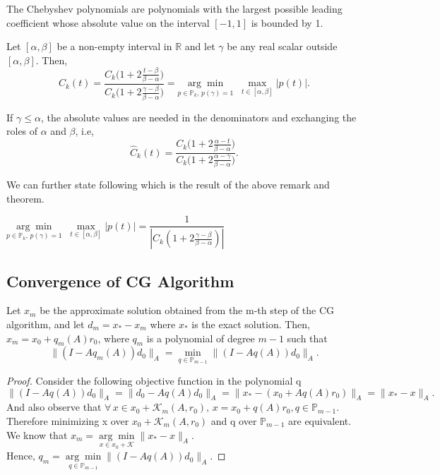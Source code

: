 \documentclass[10pt,a4paper]{article}
\begin{document}
\begin{remark}
The Chebyshev polynomials are polynomials with the largest possible leading coefficient whose absolute value on the interval $[-1,1]$ is bounded by 1.
\end{remark}

\begin{theorem}
Let $[\alpha,\beta]$ be a non-empty interval in $\mathbb{R}$ and let $\gamma$ be any real scalar outside $[\alpha,\beta].$ Then,
$$\hat{C}_k(t)=\frac{C_k\Big(1+2\frac{t-\beta}{\beta-\alpha}\Big)}{C_k\Big(1+2\frac{\gamma-\beta}{\beta-\alpha}\Big)}=\underset{p\in\mathbb{P}_k,\,p(\gamma)=1}{\arg\min}\;\;\underset{t\in[\alpha,\beta]}{\max}|p(t)|.$$
\end{theorem}

\begin{remark}
If $\gamma\le\alpha$, the absolute values are needed in the denominators and exchanging the roles of $\alpha$ and $\beta$, i.e,
$$\hat{C}_k(t)=\frac{C_k\Big(1+2\frac{\alpha-t}{\beta-\alpha}\Big)}{C_k\Big(1+2\frac{\alpha-\gamma}{\beta-\alpha}\Big)}.$$
\end{remark}

We can further state following which is the result of the above remark and theorem.

\begin{corollary}
$\underset{p\in\mathbb{P}_k,\,p(\gamma)=1}{\arg\min}\;\;\underset{t\in[\alpha,\beta]}{\max}|p(t)| = \dfrac{1}{|C_k(1+2\frac{\gamma-\beta}{\beta-\alpha})|}$
\end{corollary}

\subsection{Convergence of CG Algorithm}

\begin{lemma}
Let $x_m$ be the approximate solution obtained from the m-th step of the CG algorithm, and let $d_m=x_*-x_m$ where $x_*$ is the exact solution. Then, $x_m=x_0+q_m(A)r_0$, where $q_m$ is a polynomial of degree $m-1$ such that
$$\|(I-Aq_m(A))d_0\|_A = \underset{q\in \mathbb{P}_{m-1}}{\min}\|(I-Aq(A))d_0\|_A.$$
\end{lemma}

\begin{proof}
Consider the following objective function in the polynomial q
$$\|(I-Aq(A))d_0\|_A = \|d_0-Aq(A)d_0\|_A = \|x_*-(x_0+Aq(A)r_0)\|_A = \|x_*-x\|_A.$$
And also observe that $\forall\,x\in x_0+\mathcal{K}_m(A,r_0),\,x=x_0+q(A)r_0,q\in\mathbb{P}_{m-1}$. Therefore minimizing x over $x_0+\mathcal{K}_m(A,r_0)$ and q over $\mathbb{P}_{m-1}$ are equivalent. We know that $x_m = \underset{x\in x_0+\mathcal{K}}{\arg\min}\|x_*-x\|_A$. $\text{Hence, }q_m=\underset{q\in \mathbb{P}_{m-1}}{\arg\min}\|(I-Aq(A))d_0\|_A.$
\end{proof}
\end{document}
